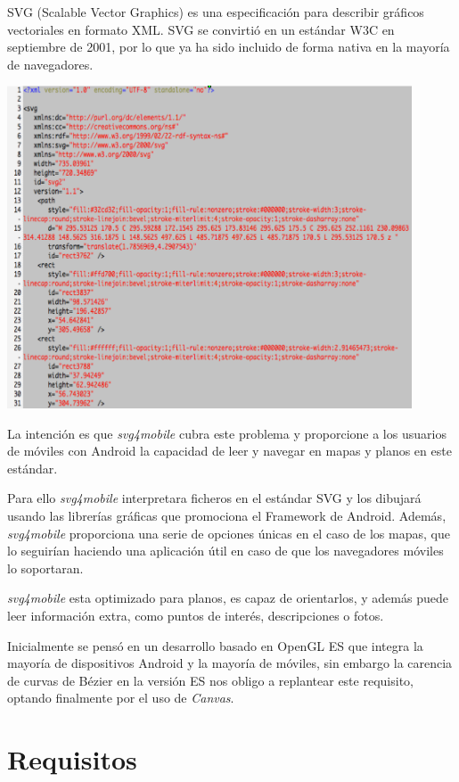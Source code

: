 \documentclass[a4paper,10pt]{article}
\begin{document}
SVG (Scalable Vector Graphics) es una especificación para describir gráficos vectoriales en formato XML. SVG se convirtió en un estándar W3C en septiembre de 2001, por lo que ya ha sido incluido de forma nativa en la mayoría de navegadores.


\begin{center}
 \includegraphics[width=12cm]{texres/svg_sample.png}
\end{center}


La intención es que \textit{svg4mobile} cubra este problema y proporcione a los usuarios de móviles con Android la capacidad de leer y navegar en mapas y planos en este estándar.

Para ello \textit{svg4mobile}  interpretara ficheros en el estándar SVG y los dibujará usando las librerías gráficas que promociona el Framework de Android.
Además, \textit{svg4mobile} proporciona una serie de opciones únicas en el caso de los mapas, que lo seguirían haciendo una aplicación útil en caso de que los navegadores móviles lo soportaran.

\textit{svg4mobile} esta optimizado para planos, es capaz de orientarlos, y además puede leer información extra, como puntos de interés, descripciones o fotos.

Inicialmente se pensó en un desarrollo basado en OpenGL ES que integra la mayoría de dispositivos Android y la mayoría de móviles, sin embargo la carencia de curvas de Bézier en la versión ES nos obligo a replantear este requisito, optando finalmente por el uso de \textit{Canvas}.

\clearpage
\section{Requisitos}
\end{document}

